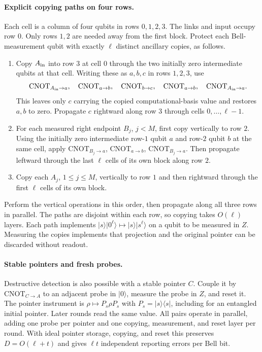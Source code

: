 \documentclass[aps,prl,twocolumn,superscriptaddress,longbibliography,reprint,floatfix]{revtex4-2}
\newcommand{\ket}[1]{\lvert #1\rangle}
\newcommand{\bra}[1]{\langle #1\rvert}
\begin{document}
\paragraph*{Explicit copying paths on four rows.}
Each cell is a column of four qubits in rows $0,1,2,3$.
The links and input occupy row $0$.
Only rows $1,2$ are needed away from the first block. Protect each
Bell-measurement qubit with exactly $\ell$ distinct ancillary copies, as follows.
\begin{enumerate}
\item Copy $A_{\rm in}$ into row $3$ at cell $0$ through the two initially
zero intermediate qubits at that cell. Writing these as $a,b,c$ in
rows $1,2,3$, use
\[
 \mathrm{CNOT}_{A_{\rm in}\to a},\quad
 \mathrm{CNOT}_{a\to b},\quad
 \mathrm{CNOT}_{b\to c},\quad
 \mathrm{CNOT}_{a\to b},\quad
 \mathrm{CNOT}_{A_{\rm in}\to a}.
\]
This leaves only $c$ carrying the copied computational-basis value
and restores $a,b$ to zero. Propagate $c$ rightward along row $3$
through cells $0,\ldots,\ell-1$.
\item For each measured right endpoint $B_j$, $j<M$, first copy
vertically to row $2$. Using the initially zero intermediate row-$1$
qubit $a$ and row-$2$ qubit $b$ at the same cell, apply
$\mathrm{CNOT}_{B_j\to a}$,
$\mathrm{CNOT}_{a\to b}$,
$\mathrm{CNOT}_{B_j\to a}$.
Then propagate leftward through the last $\ell$ cells of its own
block along row $2$.
\item Copy each $A_j$, $1\leq j\leq M$, vertically to row $1$
and then rightward through the first $\ell$ cells of its own block.
\end{enumerate}
Perform the vertical operations in this order, then propagate along
all three rows in parallel. The paths are disjoint within each row, so
copying takes $O(\ell)$ layers. Each path implements
$\ket{s}\ket{0^\ell}\mapsto\ket{s}\ket{s^\ell}$ on a qubit to be
measured in $Z$. Measuring the copies implements that projection and
the original pointer can be discarded without readout.

\paragraph*{Stable pointers and fresh probes.}
Destructive detection is also possible with a stable pointer $C$.
Couple it by $\mathrm{CNOT}_{C\to A}$ to an adjacent probe in
$\ket0$, measure the probe in $Z$, and reset it. The pointer instrument
is $\rho\mapsto P_s\rho P_s$ with $P_s=\ket{s}\bra{s}$, including for
an entangled initial pointer. Later rounds read the same value.
All pairs operate in parallel, adding one probe per pointer and one
copying, measurement, and reset layer per round. With ideal pointer
storage, copying, and reset this preserves $D=O(\ell+t)$ and gives
$\ell t$ independent reporting errors per Bell bit.
\end{document}
